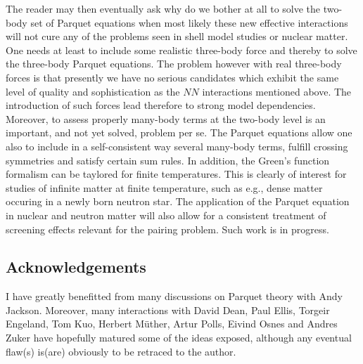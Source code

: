 The reader may then eventually ask why do we bother at all to solve
the two-body set of Parquet equations when most likely these new
effective interactions will not cure any of the problems
seen in shell model studies or nuclear matter. One needs at least to
include some realistic three-body force and thereby to solve
the three-body Parquet equations. 
The problem however with real three-body forces is that presently
we have no serious candidates which exhibit the same level
of quality and sophistication 
as the $NN$  interactions mentioned above.
The introduction of such forces lead therefore to strong model
dependencies. Moreover, to assess properly many-body terms at the two-body
level is an important, and not yet solved, problem per se.
The Parquet equations allow one also to include in a self-consistent way
several many-body terms, fulfill crossing symmetries and
satisfy certain sum rules. In addition, the Green's function formalism
can be taylored for finite temperatures. 
This is clearly of interest for studies of infinite matter at finite
temperature, such as e.g., dense matter occuring in a newly born
neutron star. 
The application of the Parquet equation in nuclear and neutron matter will also
allow for a consistent treatment of screening effects relevant for
the pairing problem. Such work is in progress.  


\subsection*{Acknowledgements}
I have greatly benefitted from many discussions on Parquet theory with 
Andy Jackson. Moreover, many interactions with David Dean, Paul Ellis,
Torgeir Engeland, Tom Kuo, 
Herbert M\"uther, Artur Polls, Eivind Osnes and Andres Zuker 
have hopefully matured
some of the ideas exposed, although any eventual flaw(s) is(are) obviously
to be retraced to the author. 

